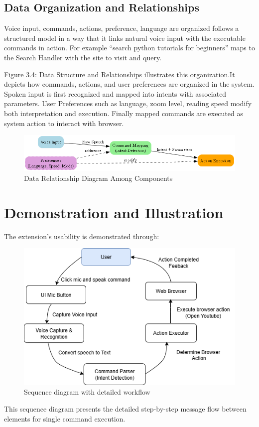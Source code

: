 \subsection{Data Organization and Relationships}
Voice input, commands, actions, preference, language are organized follows a structured model in a way that it links natural voice input with the executable commands in action. For example “search python tutorials for beginners” maps to the Search Handler with the site to visit and query.

Figure 3.4: Data Structure and Relationships illustrates this organization.It depicts how commands, actions, and user preferences are organized in the system. Spoken input is first recognized and mapped into intents with associated parameters. User Preferences such as language, zoom level, reading speed modify both interpretation and execution. Finally mapped commands are executed as system action to interact with browser.

 \begin{figure}[H] 
   \centering
   \includegraphics[width=6in]{latex/Chap3/data_structure_diagram.png}
   \caption{Data Relationship Diagram Among Components}
   \label{fig:model}
\end{figure}

\bigskip
\bigskip
\bigskip

\section{Demonstration and Illustration}
The extension’s usability is demonstrated through:

\begin{figure}[ht]
   \centering
   \includegraphics[width=5.5in]{latex/Chap3/sequence-diagram.png}
   \caption{Sequence diagram with detailed workflow }
   \label{fig:model}
\end{figure}
This sequence diagram presents the detailed step-by-step message flow between elements for single command execution.

